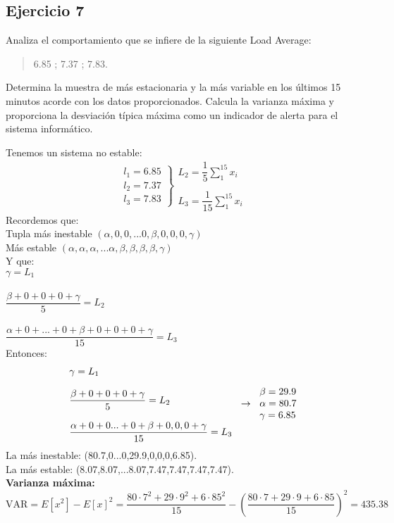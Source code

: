 \subsection{Ejercicio 7}
\noindent
Analiza el comportamiento que se infiere de la siguiente Load Average: \begin{quote}
    6.85 ; 7.37 ; 7.83.
\end{quote} Determina la muestra de más estacionaria y la más variable en los últimos 15 minutos acorde con los datos proporcionados. Calcula la varianza máxima y proporciona la desviación típica máxima como un indicador de alerta para el sistema informático.
\begin{tcolorbox}[colback=white,colframe=cyan!50!black,fonttitle=\bfseries]
Tenemos un sistema no estable:
\[\left.\begin{array}{lll}
l_1=6.85\\
l_2=7.37\\
l_3=7.83
\end{array}\right\rbrace\left.\begin{array}{ll}
L_2=\dfrac{1}{5}\sum_1^{15}x_i\\\\
L_3=\dfrac{1}{15}\sum_1^{15}x_i
\end{array}\right.
\]
Recordemos que:\\
Tupla más inestable $(\alpha,0,0,...0,\beta,0,0,0,\gamma)$\\
Más estable $(\alpha,\alpha,\alpha,...\alpha,\beta,\beta,\beta,\beta,\gamma)$\\
Y que:\\
$\gamma = L_1$\\\\
$\dfrac{\beta+0+0+0+\gamma}{5} = L_2$\\\\
$\dfrac{\alpha+0+...+0+\beta+0+0+0+\gamma}{15} = L_3$\\Entonces:
\[\left.\begin{array}{lll}
\gamma=L_1\\\\
\dfrac{\beta+0+0+0+\gamma}{5}=L_2\\\\
\dfrac{\alpha+0+0...+0+\beta+0,0,0+\gamma}{15}=L_3
\end{array}\right.\rightarrow\left.\begin{array}{lll}
\beta=29.9\\
\alpha=80.7\\
\gamma=6.85
\end{array}\right.
\]
La más inestable: (80.7,0...0,29.9,0,0,0,6.85).\\
La más estable: (8.07,8.07,...8.07,7.47,7.47,7.47,7.47).\\

\textbf{Varianza máxima:}
\[
\text{VAR}=E[x^2]-E[x]^2=\dfrac{80\cdot 7^2+29\cdot 9^2+6\cdot 85^2}{15}-\left(\dfrac{80\cdot 7+29\cdot 9+6\cdot 85}{15}\right)^2=435.38
\]
\end{tcolorbox}
